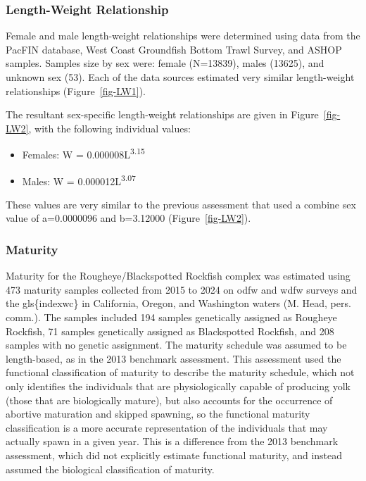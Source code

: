 \documentclass[
]{scrartcl}
\providecommand{\tightlist}{%
  \setlength{\itemsep}{0pt}\setlength{\parskip}{0pt}}\usepackage{longtable,booktabs,array}
\begin{document}
\subsubsection{Length-Weight
Relationship}\label{length-weight-relationship}

Female and male length-weight relationships were determined using data
from the PacFIN database, West Coast Groundfish Bottom Trawl Survey, and
ASHOP samples. Samples size by sex were: female (N=13839), males
(13625), and unknown sex (53). Each of the data sources estimated very
similar length-weight relationships (Figure~\ref{fig-LW1}).

The resultant sex-specific length-weight relationships are given in
Figure~\ref{fig-LW2}, with the following individual values:

\begin{itemize}
\tightlist
\item
  Females: W = 0.000008L\textsuperscript{3.15}
\item
  Males: W = 0.000012L\textsuperscript{3.07}
\end{itemize}

These values are very similar to the previous assessment that used a
combine sex value of a=0.0000096 and b=3.12000 (Figure~\ref{fig-LW2}).

\subsubsection{Maturity}\label{maturity}

Maturity for the Rougheye/Blackspotted Rockfish complex was estimated
using 473 maturity samples collected from 2015 to 2024 on \gls{odfw} and
\gls{wdfw} surveys and the gls\{indexwc\} in California, Oregon, and
Washington waters (M. Head, pers. comm.). The samples included 194
samples genetically assigned as Rougheye Rockfish, 71 samples
genetically assigned as Blackspotted Rockfish, and 208 samples with no
genetic assignment. The maturity schedule was assumed to be
length-based, as in the 2013 benchmark assessment. This assessment used
the functional classification of maturity to describe the maturity
schedule, which not only identifies the individuals that are
physiologically capable of producing yolk (those that are biologically
mature), but also accounts for the occurrence of abortive maturation and
skipped spawning, so the functional maturity classification is a more
accurate representation of the individuals that may actually spawn in a
given year. This is a difference from the 2013 benchmark assessment,
which did not explicitly estimate functional maturity, and instead
assumed the biological classification of maturity.
\end{document}

